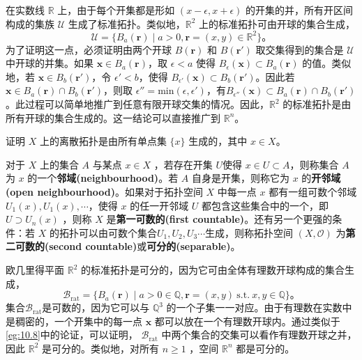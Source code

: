 \begin{theorem}
\begin{theorem}
\begin{eg}\label{eg:10.8}
	在实数线 $\mathbb{R}$ 上，由于每个开集都是形如 $(x-\epsilon ,x+\epsilon )$ 的开集的并，所有开区间构成的集族 $\mathcal{U}$ 生成了标准拓扑。类似地，$\mathbb{R}^{2}$ 上的标准拓扑可由开球的集合生成，
\begin{equation*}
\mathcal{U} =\{B_{a} (\mathbf{r} )\mid a >0,\mathbf{r} =( x,y) \in \mathbb{R}^{2} \}。
\end{equation*}
为了证明这一点，必须证明由两个开球 $B(\mathbf{r} )$ 和 $B(\mathbf{r} ')$ 取交集得到的集合是 $\mathcal{U}$ 中开球的并集。如果 $\mathbf{x} \in B_{a} (\mathbf{r} )$，取 $\epsilon < a$ 使得 $B_{\epsilon } (\mathbf{x} )\subset B_{a} (\mathbf{r} )$ 的值。类似地，若 $\mathbf{x} \in B_{b} (\mathbf{r} ')$，令 $\epsilon '< b$，使得 $B_{\epsilon '} (\mathbf{x} )\subset B_{b} (\mathbf{r} ')$。因此若 $\mathbf{x} \in B_{a} (\mathbf{r} )\cap B_{b} (\mathbf{r} ')$，则取 $\epsilon ''=\mathrm{min}( \epsilon ,\epsilon ')$，有$B_{\epsilon ''} (\mathbf{x} )\subset B_{a} (\mathbf{r} )\cap B_{b} (\mathbf{r} ')$。此过程可以简单地推广到任意有限开球交集的情况。因此，$\mathbb{R}^{2}$ 的标准拓扑是由所有开球的集合生成的。这一结论可以直接推广到 $\mathbb{R}^{n}$。
\end{eg}

\begin{exercise}
	证明 $X$ 上的离散拓扑是由所有单点集 $\{x\}$ 生成的，其中 $x\in X$。
\end{exercise}

	对于 $X$ 上的集合 $A$ 与某点 $x\in X$ ，若存在开集 $U$使得 $x\in U\subset A$，则称集合 $A$ 为 $x$ 的一个\textbf{邻域(neighbourhood)}。若 $A$ 自身是开集，则称它为 $x$ 的\textbf{开邻域(open neighbourhood)}。如果对于拓扑空间 $X$ 中每一点 $x$ 都有一组可数个邻域 $U_{1}( x) ,U_{1}( x) ,\cdots $，使得 $x$ 的任一开邻域 $U$ 都包含这些集合中的一个，即 $U\supset U_{n}( x)$ ，则称 $X$ 是\textbf{第一可数的(first countable)}。还有另一个更强的条件：若 $X$ 的拓扑可以由可数个集合$U_{1} ,U_{2} ,U_{3} \cdots $生成，则称拓扑空间 $( X,\mathcal{O})$ 为\textbf{第二可数的(second countable)}或\textbf{可分的(separable)}。

\begin{eg}\label{eg:10.9}
	欧几里得平面 $\mathbb{R}^{2}$ 的标准拓扑是可分的，因为它可由全体有理数开球构成的集合生成，
\begin{equation*}
\mathcal{B}_{\mathrm{rat}} =\{B_{a} (\mathbf{r} )\mid a >0\in \mathbb{Q} ,\mathbf{r} =( x,y) \ \mathrm{s.t.} \ x,y\in \mathbb{Q} \}。
\end{equation*}
集合$\mathcal{B}_{\mathrm{rat}}$是可数的，因为它可以与 $\mathbb{Q}^{3}$ 的一个子集一一对应。由于有理数在实数中是稠密的，一个开集中的每一点 $\mathbf{x}$ 都可以放在一个有理数开球内。通过类似于\ref{eg:10.8}中的论证，可以证明， $\mathcal{B}_{\mathrm{rat}}$ 中两个集合的交集可以看作有理数开球之并，因此 $\mathbb{R}^{2}$ 是可分的。类似地，对所有 $n\geq 1$ ，空间 $\mathbb{R}^{n}$ 都是可分的。
\end{eg}


\end{theorem}
\end{theorem}
